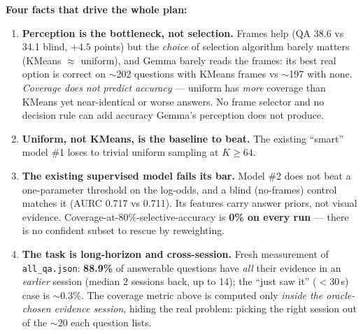 \documentclass[11pt]{article}
\newcommand{\code}[1]{\texttt{#1}}
\begin{document}
\noindent\textbf{Four facts that drive the whole plan:}
\begin{enumerate}[leftmargin=1.5em,topsep=2pt,itemsep=2pt]
\item \textbf{Perception is the bottleneck, not selection.} Frames help (QA 38.6 vs 34.1 blind, $+4.5$ points) but the \emph{choice} of selection algorithm barely matters (KMeans $\approx$ uniform), and Gemma barely reads the frames: its best real option is correct on $\sim$202 questions with KMeans frames vs $\sim$197 with none. \emph{Coverage does not predict accuracy} --- uniform has \emph{more} coverage than KMeans yet near-identical or worse answers. No frame selector and no decision rule can add accuracy Gemma's perception does not produce.
\item \textbf{Uniform, not KMeans, is the baseline to beat.} The existing ``smart'' model \#1 loses to trivial uniform sampling at $K\ge 64$.
\item \textbf{The existing supervised model fails its bar.} Model \#2 does not beat a one-parameter threshold on the log-odds, and a blind (no-frames) control matches it (AURC 0.717 vs 0.711). Its features carry answer priors, not visual evidence. Coverage-at-80\%-selective-accuracy is \textbf{0\% on every run} --- there is no confident subset to rescue by reweighting.
\item \textbf{The task is long-horizon and cross-session.} Fresh measurement of \code{all\_qa.json}: \textbf{88.9\%} of answerable questions have \emph{all} their evidence in an \emph{earlier} session (median 2 sessions back, up to 14); the ``just saw it'' ($<$30\,s) case is $\sim$0.3\%. The coverage metric above is computed only \emph{inside the oracle-chosen evidence session}, hiding the real problem: picking the right session out of the $\sim$20 each question lists.
\end{enumerate}
\end{document}
